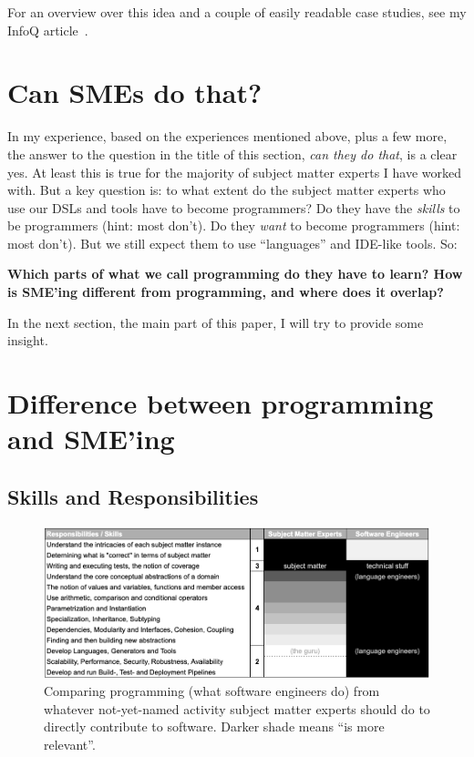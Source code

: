 \documentclass[runningheads]{llncs}
\begin{document}
\vspace{3mm}

\noindent For an overview over this idea and a couple of easily readable 
case studies, see my InfoQ article~\cite{infoq}.

\section{Can SMEs do that?}

In my experience, based on the experiences mentioned above, plus a few more, the
answer to the question in the title of this section, \emph{can they do that}, is
a clear yes. At least this is true for the majority of subject matter experts I
have worked with. But a key question is: to what extent do the subject matter
experts who use our DSLs and tools have to become programmers? Do they have the
\emph{skills} to be programmers (hint: most don't). Do they \emph{want} to
become programmers (hint: most don't). But we still expect them to use
``languages'' and IDE-like tools. So:

\vspace{2mm}
\noindent \textbf{Which parts of what we call programming do they have to learn?
How is SME'ing different from programming, and where does it overlap?}
\vspace{2mm}

\noindent In the next section, the main part of this paper, I will try to provide some
insight.

\section{Difference between programming and SME'ing}



\subsection{Skills and Responsibilities}

\begin{figure}
\begin{center}
    \includegraphics[width=1\columnwidth]{figures/table-respo.png}
    \caption{Comparing programming (what software engineers do) from
    whatever not-yet-named activity subject matter experts should do to 
    directly contribute to software. Darker shade means ``is more relevant''.}
    \label{table-respo}
\end{center} 
\end{figure} 
\end{document}
